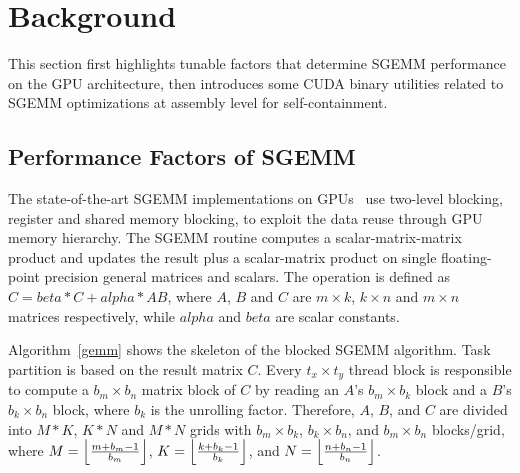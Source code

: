 \section{Background}
\label{sec:background}

This section first highlights tunable factors that determine SGEMM performance on the GPU architecture, then introduces some CUDA binary utilities related to SGEMM optimizations at assembly level for self-containment. 


\subsection{Performance Factors of SGEMM}
\label{sec:sgemm}
The state-of-the-art SGEMM implementations on GPUs~\cite{magma,nervana_sgemm_wiki,lai,tan} use two-level blocking,
register and shared memory blocking, to exploit the data reuse through GPU memory hierarchy.
The SGEMM routine computes a scalar-matrix-matrix product and updates the result plus
a scalar-matrix product on single floating-point precision general matrices and scalars. 
The operation is defined as $C
= beta*C + alpha*AB$, where $A$, $B$ and $C$ are $m\times k$, $k\times n$ and
$m\times n$ matrices respectively, while $alpha$ and $beta$ are scalar constants.

Algorithm~\ref{gemm} shows the skeleton of the blocked SGEMM algorithm. 
Task partition is based on the result matrix $C$. 
Every $t_x \times t_y$ thread block is responsible to compute a $b_m \times b_n$ matrix block of $C$ by reading an $A$'s $b_m \times b_k$ block and a $B$'s $b_k \times b_n$ block, where $b_k$ is the unrolling factor.
Therefore, $A$, $B$, and $C$ are divided into $M*K$, $K*N$ and 
$M*N$ grids with $b_m \times b_k$, $b_k \times b_n$, and $b_m \times b_n$ blocks/grid, where $M=\Bigl\lfloor \frac{m+b_m-1}{b_m} \Bigr\rfloor$, 
$K=\Bigl\lfloor \frac{k+b_k-1}{b_k} \Bigr\rfloor$, and $N=\Bigl\lfloor \frac{n+b_n-1}{b_n} \Bigr\rfloor$.

